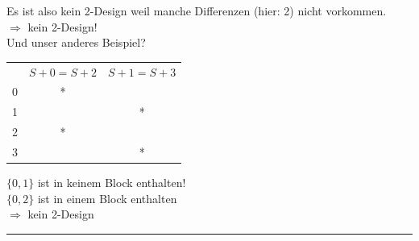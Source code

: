 \documentclass[9pt]{article}
\begin{document}
\begin{fr}
{Es ist also kein 2-Design weil manche Differenzen (hier: 2) nicht vorkommen. \\
$\Rightarrow$ kein 2-Design! \\
Und unser anderes Beispiel? 
\begin{table}[H]
    \centering \color{Blue}
    \begin{tabular}{c|cc}
         &  $S+0 = S+2$ & $S+1 = S+3$  \\
         0 & * &   \\
         1 & & *  \\
         2 &  * & \\
         3 & & *  \\
    \end{tabular}
\end{table}
\noindent $\{0,1\}$ ist in keinem Block enthalten! \\
$\{0,2\}$ ist in einem Block enthalten\\
$\Rightarrow$ kein 2-Design 
}
\end{fr} \noindent \rule{8cm}{0.4pt}
\end{document}
